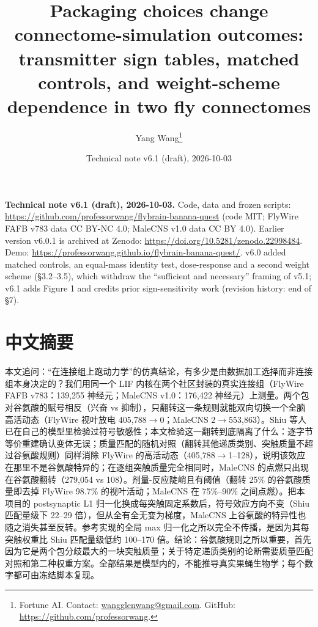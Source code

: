 \documentclass[11pt,a4paper]{article}
\title{Packaging choices change connectome-simulation outcomes:\\
transmitter sign tables, matched controls, and weight-scheme\\
dependence in two fly connectomes}
\author{Yang Wang\thanks{Fortune AI. Contact: \href{mailto:wangglenwang@gmail.com}{wangglenwang@gmail.com}. GitHub: \url{https://github.com/professorwang}.}}
\date{Technical note v6.1 (draft), 2026-10-03}
\newcommand{\ds}[1]{\textcolor{linkblue}{\url{#1}}}
\begin{document}
\maketitle

\begin{sloppypar}
\noindent\small
\textbf{Technical note v6.1 (draft), 2026-10-03.} Code, data and frozen scripts:
\ds{https://github.com/professorwang/flybrain-banana-quest} (code MIT; FlyWire
FAFB v783 data CC BY-NC 4.0; MaleCNS v1.0 data CC BY 4.0). Earlier version
v6.0.1 is archived at Zenodo: \ds{https://doi.org/10.5281/zenodo.22998484}.
Demo: \ds{https://professorwang.github.io/flybrain-banana-quest/}. v6.0 added
matched controls, an equal-mass identity test, dose-response and a second
weight scheme (\S3.2--3.5), which withdraw the ``sufficient and necessary''
framing of v5.1; v6.1 adds Figure 1 and credits prior sign-sensitivity work
(revision history: end of \S7).
\normalsize
\end{sloppypar}

\section*{中文摘要}
本文追问：“在连接组上跑动力学”的仿真结论，有多少是由数据加工选择而非连接组本身决定的？我们用同一个 LIF 内核在两个社区封装的真实连接组（FlyWire FAFB v783：139,255 神经元；MaleCNS v1.0：176,422 神经元）上测量。两个包对谷氨酸的赋号相反（兴奋 vs 抑制），只翻转这一条规则就能双向切换一个全脑高活动态（FlyWire 视叶放电 405,788$\to$0；MaleCNS 2$\to$553,863）。Shiu 等人已在自己的模型里检验过符号敏感性；本文检验这一翻转到底隔离了什么：逐字节等价重建确认变体无误；质量匹配的随机对照（翻转其他递质类别、突触质量不超过谷氨酸规则）同样消除 FlyWire 的高活动态（405,788$\to$1--128），说明该效应在那里不是谷氨酸特异的；在逐组突触质量完全相同时，MaleCNS 的点燃只出现在谷氨酸翻转（279,054 vs 108）。剂量-反应陡峭且有阈值（翻转 25\% 的谷氨酸质量即去掉 FlyWire 98.7\% 的视叶活动；MaleCNS 在 75\%--90\% 之间点燃）。把本项目的 postsynaptic L1 归一化换成每突触固定系数后，符号效应方向不变（Shiu 匹配量级下 22--29 倍），但从全有全无变为梯度，MaleCNS 上谷氨酸的特异性也随之消失甚至反转。参考实现的全局 max 归一化之所以完全不传播，是因为其每突触权重比 Shiu 匹配量级低约 100--170 倍。结论：谷氨酸规则之所以重要，首先因为它是两个包分歧最大的一块突触质量；关于特定递质类别的论断需要质量匹配对照和第二种权重方案。全部结果是模型内的，不能推导真实果蝇生物学；每个数字都可由冻结脚本复现。
\end{document}

